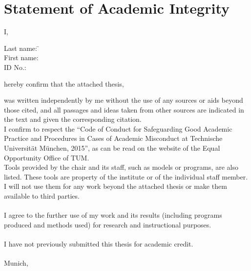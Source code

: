 
\chapter*{Statement of Academic Integrity}

I,
\begin{tabbing}
Last name: \= \lastn \\
First name: \> \firstn \\
ID No.: \> \matrnr \\
\end{tabbing}
hereby confirm that the attached thesis,
\begin{center}
\MyTitle
\end{center}
was written independently by me without the use of any sources or aids beyond those cited, and all passages and ideas taken from other sources are indicated in the text and given the corresponding citation.\\
I confirm to respect the “Code of Conduct for Safeguarding Good Academic Practice and Procedures in Cases of Academic Misconduct at Technische Universität München, 2015”, as can be read on the website of the Equal Opportunity Office of TUM.\\
Tools provided by the chair and its staff, such as models or programs, are also listed. These tools are property of the institute or of the individual staff member. I will not use them for any work beyond the attached thesis or make them available to third parties.\\
\vspace*{1cm}\\
I agree to the further use of my work and its results (including programs produced and methods used) for research and instructional purposes.\\
\vspace*{1cm}\\
I have not previously submitted this thesis for academic credit.\\
\vspace*{2cm}\\
Munich, \dateosub \hspace{0.5cm} \makebox[1.5in]{\hrulefill}